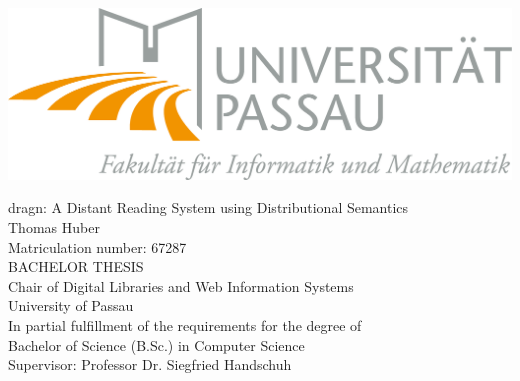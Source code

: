 \thispagestyle{empty}
\includegraphics[scale=0.4, right]{fig/uni-passau}
\mbox{}

\begin{center}
\Huge{dragn: A Distant Reading System using Distributional Semantics}\\[4pc]

\Large{Thomas Huber}\\[1pc]
\large{Matriculation number: 67287}
\large{}\\[5pc]

BACHELOR THESIS\\
Chair of Digital Libraries and Web Information Systems\\
University of Passau\\

In partial fulfillment of the requirements for the degree of\\
Bachelor of Science (B.Sc.) in Computer Science\\[10pc]

\large{Supervisor: Professor Dr. Siegfried Handschuh}

\end{center}
\vfill
